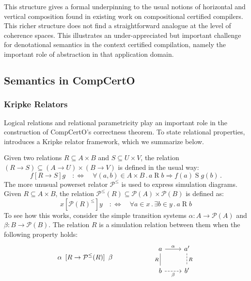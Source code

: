 \documentclass[acmsmall,screen,review,anonymous]{acmart}
\newcommand{\ifr}[1]{\mathrel{[{#1}]}}
\begin{document}
This structure gives a formal underpinning to the usual notions of
horizontal and vertical composition
found in existing work on compositional certified compilers.
This richer structure
does not find a straightforward analogue
at the level of coherence spaces.
This illustrates an under-appreciated but important challenge
for denotational semantics in the context certified compilation,
namely the important role of abstraction
in that application domain.


\subsection{Semantics in CompCertO} \label{sec:basic:compcerto} %


\subsubsection{Kripke Relators} %

Logical relations
and relational parametricity
play an important role
in the construction of CompCertO's correctness theorem.
To state relational properties,
\citet{compcerto}
introduces a Kripke relator framework,
which we summarize below.

Given two relations
$R \subseteq A \times B$ and
$S \subseteq U \times V$,
the relation
$(R \rightarrow S) \subseteq
 (A \rightarrow U) \times
 (B \rightarrow V)$
is defined in the usual way:
\[
  f \ifr{R \rightarrow S} g
  \quad:\Leftrightarrow\quad
  \forall (a, b) \in A \times B \mathbin.
    a \mathrel{R} b \Rightarrow
    f(a) \mathrel{S} g(b)
  \,.
\]
The more unusual powerset relator $\mathcal{P}^\le$
is used to express simulation diagrams.
Given $R \subseteq A \times B$,
the relation
$\mathcal{P}^\le(R) \subseteq \mathcal{P}(A) \times \mathcal{P}(B)$
is defined as:
\[
  x \ifr{\mathcal{P}(R)^\le} y
  \quad:\Leftrightarrow\quad
  \forall a \in x \mathbin.
  \exists b \in y \mathbin.
  a \mathrel{R} b
\]
To see how this works,
consider the simple transition systems
$\alpha : A \rightarrow \mathcal{P}(A)$
and
$\beta : B \rightarrow \mathcal{P}(B)$.
The relation $R$ is a simulation relation between them
when the following property holds:
\[
  \alpha \:\ifr{R \rightarrow \mathcal{P}^\le(R)}\: \beta
  \qquad\qquad\qquad
  \begin{tikzcd}
    a \ar[r, "\alpha"] \ar[d, dash, "R"'] &
    a' \ar[d, dash, dashed, "R"] \\
    b \ar[r, dashed, "\beta"'] &
    b'
  \end{tikzcd}
\]
\end{document}
